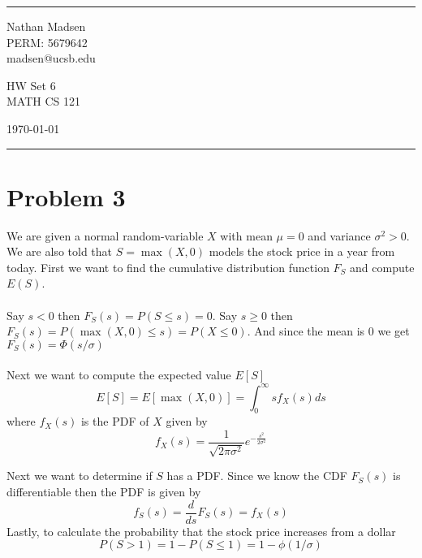 \documentclass[a4paper]{article}
\begin{document}

\fancyhead[C]{}
\hrule \medskip %
\begin{minipage}{0.295\textwidth} 
\raggedright
\footnotesize
Nathan Madsen\hfill\\   
PERM: 5679642\hfill\\
madsen@ucsb.edu
\end{minipage}
\begin{minipage}{0.4\textwidth} 
\centering 
\large 
HW Set 6\\ 
\normalsize 
MATH CS 121\\ 
\end{minipage}
\begin{minipage}{0.295\textwidth} 
\raggedleft
\today\hfill\\
\end{minipage}
\medskip\hrule 
\bigskip


\section*{Problem 3}
We are given a normal random-variable $X$ with mean $\mu = 0$ and variance $\sigma^2 > 0$. We are also told that $S = \max(X,0)$ models the stock price in a year from today. First we want to find the cumulative distribution function $F_S$ and compute $E(S)$. 
\\ \\
Say $s<0$ then $F_S(s) = P(S \leq s) = 0$. Say $s \geq 0$ then $F_S(s) = P(\max(X,0) \leq s) = P(X \leq 0)$. And since the mean is $0$ we get $F_S(s) = \Phi (s/\sigma)$
\\ \\
Next we want to compute the expected value $E[S]$
\[ E[S] = E[\max(X,0)] = \int_0^\infty sf_X(s)ds \]
where $f_X(s)$ is the PDF of $X$ given by 
\[ f_X(s) = \frac{1}{\sqrt{2\pi \sigma^2}}e^{-\frac{s^2}{2\sigma^2}}\]

Next we want to determine if $S$ has a PDF. Since we know the CDF $F_S(s)$ is differentiable then the PDF is given by
\[ f_S(s) = \frac{d}{ds}F_S(s) = f_X(s)\]
Lastly, to calculate the probability that the stock price increases from a dollar
\[ P(S>1) = 1 - P(S\leq 1) = 1- \phi(1/\sigma) \]
\end{document}
